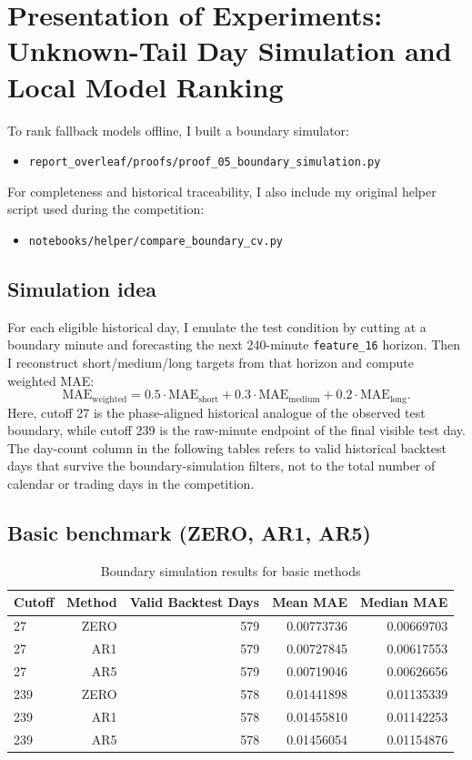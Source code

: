 \section{Presentation of Experiments: Unknown-Tail Day Simulation and Local Model Ranking}

To rank fallback models offline, I built a boundary simulator:
\begin{itemize}[leftmargin=1.5em]
  \item \texttt{report\_overleaf/proofs/proof\_05\_boundary\_simulation.py}
\end{itemize}
For completeness and historical traceability, I also include my original helper script used during the competition:
\begin{itemize}[leftmargin=1.5em]
  \item \texttt{notebooks/helper/compare\_boundary\_cv.py}
\end{itemize}

\subsection{Simulation idea}
For each eligible historical day, I emulate the test condition by cutting at a boundary minute and forecasting the next 240-minute \texttt{feature\_16} horizon. Then I reconstruct short/medium/long targets from that horizon and compute weighted MAE:
\begin{equation}
\text{MAE}_{\text{weighted}} = 0.5\cdot\text{MAE}_{\text{short}} + 0.3\cdot\text{MAE}_{\text{medium}} + 0.2\cdot\text{MAE}_{\text{long}}.
\end{equation}
Here, cutoff 27 is the phase-aligned historical analogue of the observed test boundary, while cutoff 239 is the raw-minute endpoint of the final visible test day.
The day-count column in the following tables refers to valid historical backtest days that survive the boundary-simulation filters, not to the total number of calendar or trading days in the competition.

\subsection{Basic benchmark (ZERO, AR1, AR5)}
\begin{table}[h]
\centering
\caption{Boundary simulation results for basic methods}
\begin{tabular}{lrrrr}
\toprule
Cutoff & Method & Valid Backtest Days & Mean MAE & Median MAE \\
\midrule
27  & ZERO & 579 & 0.00773736 & 0.00669703 \\
27  & AR1  & 579 & 0.00727845 & 0.00617553 \\
27  & AR5  & 579 & 0.00719046 & 0.00626656 \\
239 & ZERO & 578 & 0.01441898 & 0.01135339 \\
239 & AR1  & 578 & 0.01455810 & 0.01142253 \\
239 & AR5  & 578 & 0.01456054 & 0.01154876 \\
\bottomrule
\end{tabular}
\end{table}

